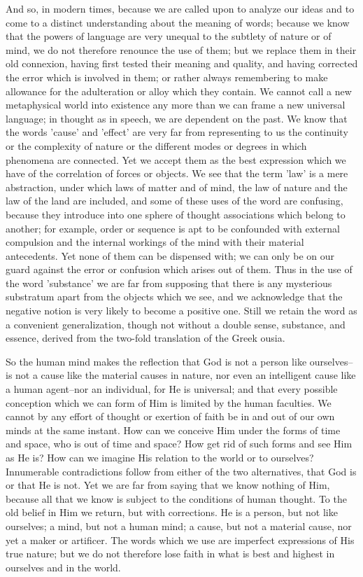 And so, in modern times, because we are called upon to analyze our ideas
and to come to a distinct understanding about the meaning of words;
because we know that the powers of language are very unequal to the
subtlety of nature or of mind, we do not therefore renounce the use of
them; but we replace them in their old connexion, having first tested
their meaning and quality, and having corrected the error which is
involved in them; or rather always remembering to make allowance for
the adulteration or alloy which they contain. We cannot call a new
metaphysical world into existence any more than we can frame a new
universal language; in thought as in speech, we are dependent on the
past. We know that the words 'cause' and 'effect' are very far from
representing to us the continuity or the complexity of nature or the
different modes or degrees in which phenomena are connected. Yet we
accept them as the best expression which we have of the correlation of
forces or objects. We see that the term 'law' is a mere abstraction,
under which laws of matter and of mind, the law of nature and the law of
the land are included, and some of these uses of the word are confusing,
because they introduce into one sphere of thought associations
which belong to another; for example, order or sequence is apt to be
confounded with external compulsion and the internal workings of the
mind with their material antecedents. Yet none of them can be dispensed
with; we can only be on our guard against the error or confusion which
arises out of them. Thus in the use of the word 'substance' we are far
from supposing that there is any mysterious substratum apart from the
objects which we see, and we acknowledge that the negative notion is
very likely to become a positive one. Still we retain the word as a
convenient generalization, though not without a double sense, substance,
and essence, derived from the two-fold translation of the Greek ousia.

So the human mind makes the reflection that God is not a person like
ourselves--is not a cause like the material causes in nature, nor even
an intelligent cause like a human agent--nor an individual, for He is
universal; and that every possible conception which we can form of Him
is limited by the human faculties. We cannot by any effort of thought
or exertion of faith be in and out of our own minds at the same instant.
How can we conceive Him under the forms of time and space, who is out of
time and space? How get rid of such forms and see Him as He is? How
can we imagine His relation to the world or to ourselves? Innumerable
contradictions follow from either of the two alternatives, that God is
or that He is not. Yet we are far from saying that we know nothing of
Him, because all that we know is subject to the conditions of human
thought. To the old belief in Him we return, but with corrections. He is
a person, but not like ourselves; a mind, but not a human mind; a cause,
but not a material cause, nor yet a maker or artificer. The words which
we use are imperfect expressions of His true nature; but we do not
therefore lose faith in what is best and highest in ourselves and in the
world.

